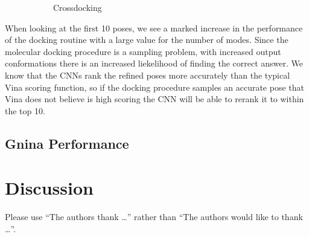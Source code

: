 \documentclass[journal=jcisd8,manuscript=article]{achemso}
\begin{document}
\begin{figure}
\begin{subfigure}[b]{0.48\textwidth}
		\caption{Crossdocking}
		\label{fig:num modes cd}
        \end{subfigure}    
	\caption{}
	\label{fig:num modes}
\end{figure}    

When looking at the first 10 poses, we see a marked increase in the performance of the docking routine with a large value for the number of modes. Since the molecular docking procedure is a sampling problem, with increased output conformations there is an increased liekelihood of finding the correct answer. We know that the CNNs rank the refined poses more accurately than the typical Vina scoring function, so if the docking procedure samples an accurate pose that Vina does not believe is high scoring the CNN will be able to rerank it to within the top 10.

\subsection{Gnina Performance}

\section{Discussion}



\begin{acknowledgement}

Please use ``The authors thank \ldots'' rather than ``The
authors would like to thank \ldots''.



\end{acknowledgement}

\begin{suppinfo}



\end{suppinfo}


\end{document}
